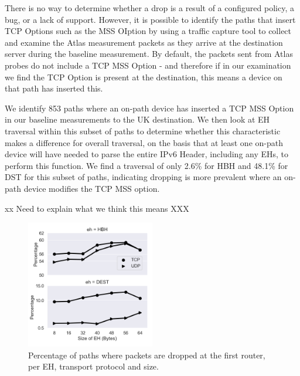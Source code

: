 \documentclass[conference]{IEEEtran}
\begin{document}
There is no way to determine whether a drop is a result of a configured policy, a bug, or a lack of support. 
However, it is possible to identify the paths that insert TCP Options such as the MSS OIption by using a traffic capture tool to collect and examine the Atlas measurement packets as they arrive at the destination server during the baseline measurement. By default, the packets sent from Atlas probes do not include a TCP MSS Option - and therefore if in our examination we find the TCP Option is present at the destination, this means a device on that path has inserted this.

We identify 853 paths where an on-path device has inserted a TCP MSS Option in our baseline measurements to the UK destination. We then look at EH traversal within this subset of paths to determine whether this characteristic makes a difference for overall traversal, on the basis that at least one on-path device will have needed to parse the entire IPv6 Header, including any EHs, to perform this function.
We find a traversal of only 2.6\% for HBH and 48.1\% for DST for this subset of paths, indicating dropping is more prevalent where an on-path device modifies the TCP MSS option.

xx Need to explain what we think this means XXX

\begin{figure}
\centering
  \includegraphics[width=0.5\textwidth]{empty_paths.png}
  \caption{Percentage of paths where packets are dropped at the first router, per EH, transport protocol and size.}
  \label{fig:empty_paths}
\end{figure}
\end{document}
